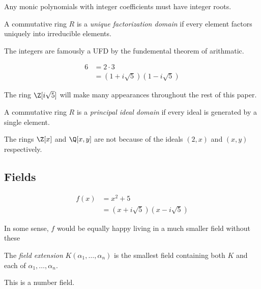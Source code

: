 Any monic polynomials with integer coefficients must have integer roots.

\begin{definition}
	A commutative ring $R$ is a \emph{unique factorization domain} if every element factors uniquely into irreducible elements.
\end{definition}

The integers are famously a UFD by the fundemental theorem of arithmatic.

\begin{equation}
	\begin{aligned}
		6 & = 2 \cdot 3                     \\
		  & = (1 + i \sqrt5) (1 - i \sqrt5)
	\end{aligned}
\end{equation}

The ring $\Z[i \sqrt 5]$ will make many appearances throughout the rest of this paper.

\begin{definition}
	A commutative ring $R$ is a \emph{principal ideal domain} if every ideal is generated by a single element.
\end{definition}


The rings $\Z[x]$ and $\Q[x, y]$ are not because of the ideals $(2, x)$ and $(x, y)$ respectively.

\subsection{Fields}

\begin{definition}[Field]
\end{definition}


\begin{equation}
	\begin{aligned}
		f(x) & = x^2 + 5                        \\
		     & = (x + i \sqrt 5)(x - i \sqrt 5)
	\end{aligned}
\end{equation}

In some sense, $f$ would be equally happy living in a much smaller field without these

\begin{definition}
	The \emph{field extension} $K(\alpha_1, \ldots, \alpha_n)$ is the smallest field containing both $K$ and each of $\alpha_1, \ldots, \alpha_n$.
\end{definition}

This is a number field.
